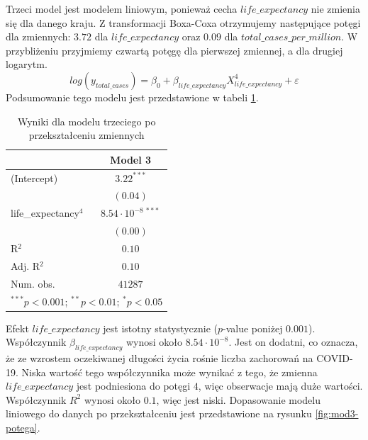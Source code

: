 \documentclass[12pt]{mwbk}
\theoremstyle{plain}
\theoremstyle{definition}
\theoremstyle{definition}
\begin{document}
Trzeci model jest modelem liniowym, ponieważ cecha $life\_expectancy$ nie zmienia się dla danego kraju. Z transformacji Boxa-Coxa otrzymujemy następujące potęgi dla zmiennych: $3.72$ dla $life\_expectancy$ oraz $0.09$ dla $total\_cases\_per\_million$. W przybliżeniu przyjmiemy czwartą potęgę dla pierwszej zmiennej, a dla drugiej logarytm.
$$log(y_{total\_cases})=\beta_0+\beta_{life\_expectancy}X_{life\_expectancy}^4+\varepsilon$$
Podsumowanie tego modelu jest przedstawione w tabeli \ref{table:mod3-potega}.

\newpage

\begin{table}[!htbp]
	\begin{center}
		\begin{tabular}{l c}
		\hline
		& Model 3 \\
		\hline
		(Intercept)          & $3.22^{***}$ \\
		& $(0.04)$     \\
		life\_expectancy$^4$ & $8.54\cdot10^{-8~  ***}$ \\
		& $(0.00)$     \\
		\hline
		R$^2$                & $0.10$       \\
		Adj. R$^2$           & $0.10$       \\
		Num. obs.            & $41287$      \\
		\hline
		\multicolumn{2}{l}{\scriptsize{$^{***}p<0.001$; $^{**}p<0.01$; $^{*}p<0.05$}}
	\end{tabular}
		\caption{Wyniki dla modelu trzeciego po przekształceniu zmiennych}
		\label{table:mod3-potega}
	\end{center}
\end{table}

Efekt $life\_expectancy$ jest istotny statystycznie ($p$-value poniżej $0.001$). Współczynnik $\beta_{life\_expectancy}$ wynosi około $8.54 \cdot 10^{-8}$. Jest on dodatni, co oznacza, że ze wzrostem oczekiwanej długości życia rośnie liczba zachorowań na COVID-19. Niska wartość tego współczynnika może wynikać z tego, że zmienna $life\_expectancy$ jest podniesiona do potęgi $4$, więc obserwacje mają duże wartości. Współczynnik $R^2$ wynosi około $0.1$, więc jest niski. Dopasowanie modelu liniowego do danych po przekształceniu jest przedstawione na rysunku \ref{fig:mod3-potega}.
\end{document}
